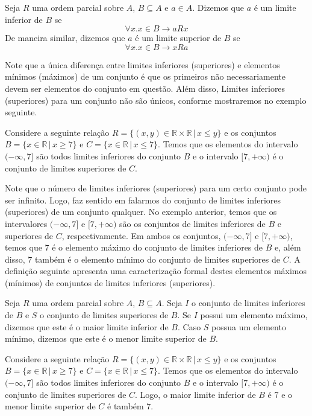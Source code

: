 \begin{Definition}
Seja $R$ uma ordem parcial sobre $A$, $B \subseteq A$ e $a \in
A$. Dizemos que $a$ é um limite inferior de $B$ se
\[
\forall x. x \in B \to a R x
\]
De maneira similar, dizemos que $a$ é um limite superior de $B$ se
\[
\forall x. x \in B \to x R a
\]
\end{Definition}
Note que a única diferença entre limites inferiores (superiores) e
elementos mínimos (máximos) de um conjunto é que os primeiros não
necessariamente devem ser elementos do conjunto em questão.
Além disso, Limites inferiores (superiores) para um conjunto não são únicos,
conforme mostraremos no exemplo seguinte.
\begin{Example}
Considere a seguinte relação $R
=\{(x,y)\in\mathbb{R}\times\mathbb{R}\,|\,x \leq y\}$ e os conjuntos
 $B = \{x \in \mathbb{R}\,|\,x \geq 7\}$ e  $C = \{x \in
 \mathbb{R}\,|\, x \leq 7\}$. Temos que os elementos do intervalo
 $(-\infty,7]$ são todos limites inferiores do conjunto $B$ e o
 intervalo $[7,+\infty)$ é o conjunto de limites superiores de $C$.
\end{Example}
Note que o número de limites inferiores (superiores) para um certo
conjunto pode ser infinito. Logo, faz sentido em falarmos do conjunto
de limites inferiores (superiores) de um conjunto qualquer. No exemplo
anterior, temos que os intervalores $(-\infty,7]$ e $[7,+\infty)$ são
os conjuntos de limites inferiores de $B$ e superiores de $C$,
respectivamente. Em ambos os conjuntos, $(-\infty,7]$ e $[7,+\infty)$,
temos que $7$ é o elemento máximo do conjunto de limites inferiores de
$B$ e, além disso, $7$ também é o elemento mínimo do conjunto de
limites superiores de $C$. A definição seguinte apresenta uma
caracterização formal destes elementos máximos (mínimos) de conjuntos
de limites inferiores (superiores).

\begin{Definition}
Seja $R$ uma ordem parcial sobre $A$, $B \subseteq A$. Seja $I$ o
conjunto de limites inferiores de $B$ e $S$ o conjunto de limites
superiores de $B$. Se $I$ possui um elemento máximo, dizemos que este
é o maior limite inferior de $B$. Caso $S$ possua um elemento mínimo,
dizemos que este é o menor limite superior de $B$.
\end{Definition}

\begin{Example}
Considere a seguinte relação $R
=\{(x,y)\in\mathbb{R}\times\mathbb{R}\,|\,x \leq y\}$ e os conjuntos
 $B = \{x \in \mathbb{R}\,|\,x \geq 7\}$ e  $C = \{x \in
 \mathbb{R}\,|\, x \leq 7\}$. Temos que os elementos do intervalo
 $(-\infty,7]$ são todos limites inferiores do conjunto $B$ e o
 intervalo $[7,+\infty)$ é o conjunto de limites superiores de
 $C$. Logo, o maior limite inferior de $B$ é $7$ e o menor limite
 superior de $C$ é também $7$.
\end{Example}


